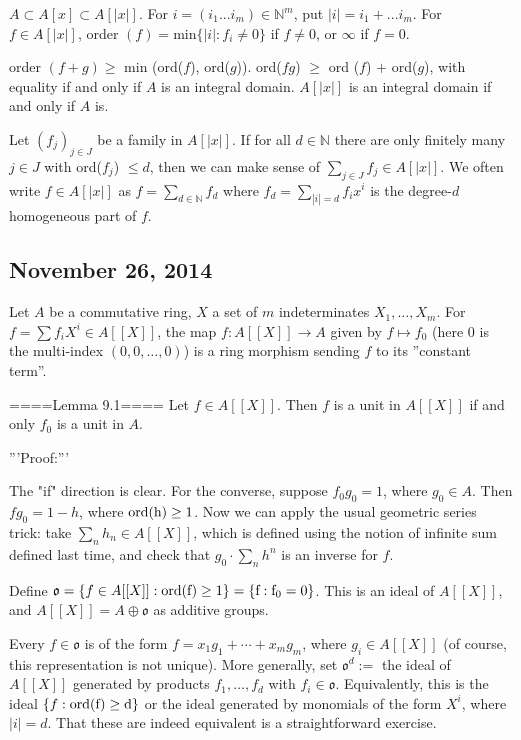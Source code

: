 $A \subset A[x] \subset A[|x|]$. For $i=(i_1...i_m ) \in \mathbb{N}^m$, put $|i|=i_1+...i_m$. For $f \in A[|x|]$, order $(f)=$min$\{|i|: f_i \neq 0\}$ if $f \neq 0$, or $\infty$ if $f=0$.

order $(f+g) \geq$ min (ord($f$), ord($g$)). ord($fg$) $\geq$ ord ($f$) $+$ ord($g$), with equality if and only if $A$ is an integral domain. $A[|x|]$ is an integral domain if and only if $A$ is.

Let $(f_j)_{j \in J}$ be a family in $A[|x|]$. If for all $d \in \mathbb{N}$ there are only finitely many $j \in J$ with ord($f_j$) $\leq d$, then we can make sense of $\sum_{j \in J}f_j \in A[|x|]$. We often write $f \in A[|x|]$ as $f=\sum_{d \in \mathbb{N}} f_d$ where $f_d=\sum_{|i|=d}f_i x^i$ is the degree-$d$ homogeneous part of $f$.

\subsection{ November 26, 2014 }
Let $A$ be a commutative ring, $X$ a set of $m$ indeterminates $X_1,\ldots,X_m$. For $f=\sum f_i X^i \in A[[X]]$, the map $f: A[[X]]\rightarrow A$ given by $f\mapsto f_0$ (here $0$ is the multi-index $(0,0,\ldots,0)$) is a ring morphism sending $f$ to its ''constant term''. 

====Lemma 9.1====
Let $f\in A[[X]]$. Then $f$ is a unit in $A[[X]]$ if and only $f_0$ is a unit in $A$.

'''Proof:'''

The "if" direction is clear. For the converse, suppose $f_0g_0=1$, where $g_0\in A$. Then $fg_0=1-h$, where $\rm{ord}(h)\ge 1$. Now we can apply the usual geometric series trick: take $\sum_n h_n\in A[[X]]$, which is defined using the notion of infinite sum defined last time, and check that $g_0\cdot \sum_n h^n$ is an inverse for $f$. 


Define $\mathfrak{o}=\{f\in A[[X]]:\rm{ord}(f)\ge 1\}=\{f:f_0=0\}$. This is an ideal of $A[[X]]$, and $A[[X]]=A\oplus \mathfrak{o}$ as additive groups. 

Every $f\in \mathfrak{o}$ is of the form $f=x_1g_1+\cdots +x_mg_m$, where $g_i\in A[[X]]$ (of course, this representation is not unique). More generally, set $\mathfrak{o}^d:=$ the ideal of $A[[X]]$ generated by products $f_1,\ldots,f_d$ with $f_i\in \mathfrak{o}$. Equivalently, this is the ideal $\{f:\rm{ord}(f)\ge d\}$ or the ideal generated by monomials of the form $X^i$, where $|i|=d$. That these are indeed equivalent is a straightforward exercise.

